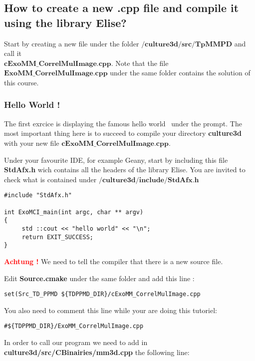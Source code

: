 \subsection{How to create a new .cpp file and compile it using the library Elise?}
Start by creating a new file under the folder $\textbf{/culture3d/src/TpMMPD}$ and call it \\$\textbf{cExoMM\_CorrelMulImage.cpp}$. Note that the file $\textbf{ExoMM\_CorrelMulImage.cpp}$ under the same folder contains the solution of this course.
\subsubsection{Hello World !}
The first exrcice is displaying the famous \og hello world \fg\ under the prompt. The most important thing here is to succeed to compile your directory \textbf{culture3d} with your new file  $\textbf{cExoMM\_CorrelMulImage.cpp}$.\newline


Under your favourite IDE, for example Geany, start by including this file \textbf{StdAfx.h} wich contains all the headers of the library Elise. You are invited to check what is contained under $\textbf{/culture3d/include/StdAfx.h}$ \newline

\begin{lstlisting}
#include "StdAfx.h" 

int ExoMCI_main(int argc, char ** argv) 
{ 
     std ::cout << "hello world" << "\n";
     return EXIT_SUCCESS; 
}
\end{lstlisting}

\textbf{\textcolor{red}{Achtung !}} We need to tell the compiler that there is a new source file. 

Edit \textbf{Source.cmake} under the same folder and add this line : \newline

\begin{verbatim}
set(Src_TD_PPMD ${TDPPMD_DIR}/cExoMM_CorrelMulImage.cpp
\end{verbatim}

You also need to comment this line while your are doing this tutoriel:
\begin{verbatim}
#${TDPPMD_DIR}/ExoMM_CorrelMulImage.cpp
\end{verbatim}

In order to call our program we need to add in \textbf{culture3d/src/CBinairies/mm3d.cpp} the following line: \newline

